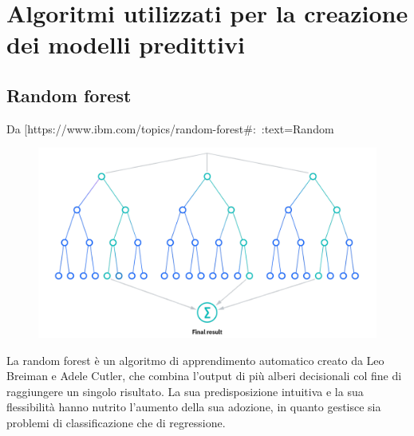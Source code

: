 \section{Algoritmi utilizzati per la creazione dei modelli predittivi}
\subsection{Random forest}
Da [https://www.ibm.com/topics/random-forest#:~:text=Random%

\begin{figure}
    \begin{center}    
        \includegraphics[width=0.9\linewidth]{images/image10.png}
    \end{center}
\end{figure}

La random forest è un algoritmo di apprendimento automatico creato da Leo Breiman e Adele Cutler, che combina l'output di più alberi decisionali col fine di raggiungere un singolo risultato. 
La sua predisposizione intuitiva e la sua flessibilità hanno nutrito l’aumento della sua adozione, in quanto gestisce sia problemi di classificazione che di regressione.

